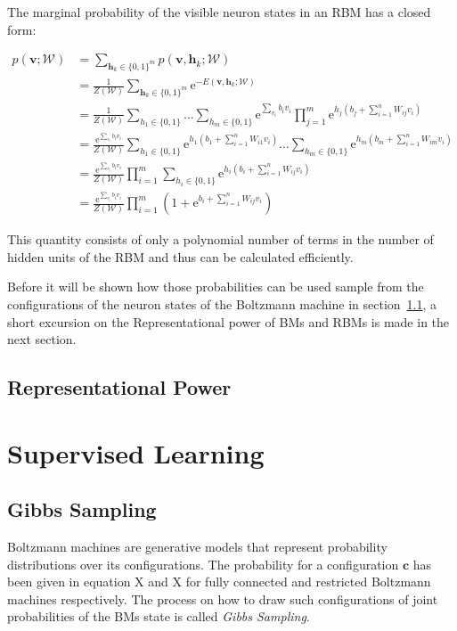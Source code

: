 The marginal probability of the visible neuron states in an RBM has a closed form:

\begin{align}
   p(\bm{v};\mathcal{W}) &= \sum_{\bm{h}_k \in \{0,1\}^m} p(\bm{v},\bm{h}_k;\mathcal{W})\\
   &= \frac{1}{Z(\mathcal{W})}\sum_{\bm{h}_k \in \{0,1\}^m} \mathrm{e}^{-E(\bm{v}, \bm{h}_k;\mathcal{W})}\\
   &= \frac{1}{Z(\mathcal{W})}\sum_{h_1\in \{0,1\}}\dots\sum_{h_m \in \{0,1\}}\mathrm{e}^{\sum_{v_i}b_iv_i}\prod_{j=1}^m\mathrm{e}^{h_j(b_j + \sum_{i=1}^nW_{ij}v_i)}\\
   &= \frac{\mathrm{e}^{\sum_{v_i}b_iv_i}}{Z(\mathcal{W})}\sum_{h_1 \in \{0,1\}}\mathrm{e}^{h_1(b_1 + \sum_{i=1}^nW_{i1}v_i)}\dots\sum_{h_m \in \{0,1\}}\mathrm{e}^{h_m(b_m + \sum_{i=1}^nW_{im}v_i)}\\
   &= \frac{\mathrm{e}^{\sum_{v_i}b_iv_i}}{Z(\mathcal{W})}\prod_{i=1}^m\sum_{h_i \in \{0,1\}}\mathrm{e}^{h_i(b_i + \sum_{i=1}^nW_{ij}v_i)}\\
   &= \frac{\mathrm{e}^{\sum_{v_i}b_iv_i}}{Z(\mathcal{W})}\prod_{i=1}^m(1+\mathrm{e}^{b_i + \sum_{i=1}^nW_{ij}v_i})
\end{align}

This quantity consists of only a polynomial number of terms in the number of hidden units of the RBM and 
thus can be calculated efficiently.

Before it will be shown how those probabilities can be used sample from the configurations of the neuron states
of the Boltzmann machine in section~\ref{sec:gibbsSampling}, a short excursion on the Representational power 
of BMs and RBMs is made in the next section.

\subsection{Representational Power}
\section{Supervised Learning}
\subsection{Gibbs Sampling}
\label{sec:gibbsSampling}
Boltzmann machines are generative models that represent probability distributions over its configurations.
The probability for a configuration $\bm{c}$ has been given in equation X and X for fully connected and 
restricted Boltzmann machines respectively. The process on how to draw such configurations of joint 
probabilities of the BMs state is called \textit{Gibbs Sampling}.

